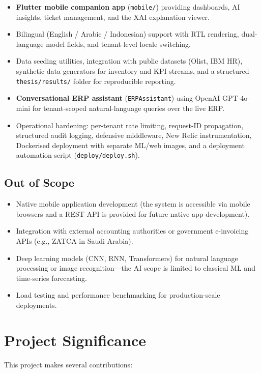 \documentclass[12pt,a4paper]{report}
\begin{document}
\begin{itemize}
  \item \textbf{Flutter mobile companion app} (\texttt{mobile/}) providing dashboards, AI insights, ticket management, and the XAI explanation viewer.
  \item Bilingual (English / Arabic / Indonesian) support with RTL rendering, dual-language model fields, and tenant-level locale switching.
  \item Data seeding utilities, integration with public datasets (Olist, IBM HR), synthetic-data generators for inventory and KPI streams, and a structured \texttt{thesis/results/} folder for reproducible reporting.
  \item \textbf{Conversational ERP assistant} (\texttt{ERPAssistant}) using OpenAI GPT-4o-mini for tenant-scoped natural-language queries over the live ERP.
  \item Operational hardening: per-tenant rate limiting, request-ID propagation, structured audit logging, defensive middleware, New Relic instrumentation, Dockerised deployment with separate ML/web images, and a deployment automation script (\texttt{deploy/deploy.sh}).
\end{itemize}

\subsection{Out of Scope}
\begin{itemize}
  \item Native mobile application development (the system is accessible via mobile browsers and a REST API is provided for future native app development).
  \item Integration with external accounting authorities or government e-invoicing APIs (e.g., ZATCA in Saudi Arabia).
  \item Deep learning models (CNN, RNN, Transformers) for natural language processing or image recognition---the AI scope is limited to classical ML and time-series forecasting.
  \item Load testing and performance benchmarking for production-scale deployments.
\end{itemize}

\section{Project Significance}
\label{sec:significance}

This project makes several contributions:
\end{document}
